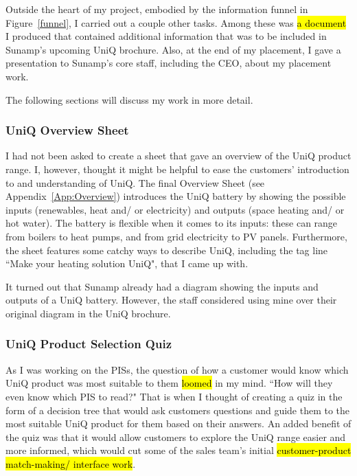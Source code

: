 Outside the heart of my project, embodied by the information funnel in Figure~\ref{funnel}, I carried out a couple other tasks.
Among these was \hl{a document} I produced that contained additional information that was to be included in Sunamp's upcoming UniQ brochure.
Also, at the end of my placement, I gave a presentation to Sunamp's core staff, including the CEO, about my placement work.

The following sections will discuss my work in more detail.



\subsubsection{UniQ Overview Sheet}

I had not been asked to create a sheet that gave an overview of the UniQ product range.
I, however, thought it might be helpful to ease the customers' introduction to and understanding of UniQ.
The final Overview Sheet (see Appendix~\ref{App:Overview}) introduces the UniQ battery by showing the possible inputs (renewables, heat and/ or electricity) and outputs (space heating and/ or hot water).
The battery is flexible when it comes to its inputs: these can range from boilers to heat pumps, and from grid electricity to PV panels.
Furthermore, the sheet features some catchy ways to describe UniQ, including the tag line ``Make your heating solution UniQ", that I came up with.

It turned out that Sunamp already had a diagram showing the inputs and outputs of a UniQ battery.
However, the staff considered using mine over their original diagram in the UniQ brochure.



\subsubsection{UniQ Product Selection Quiz} \label{sec:quiz}

As I was working on the PISs, the question of how a customer would know which UniQ product was most suitable to them \hl{loomed} in my mind.
``How will they even know which PIS to read?"
That is when I thought of creating a quiz in the form of a decision tree that would ask customers questions and guide them to the most suitable UniQ product for them based on their answers.
An added benefit of the quiz was that it would allow customers to explore the UniQ range easier and more informed, which would cut some of the sales team's initial \hl{customer-product match-making/ interface work}.

